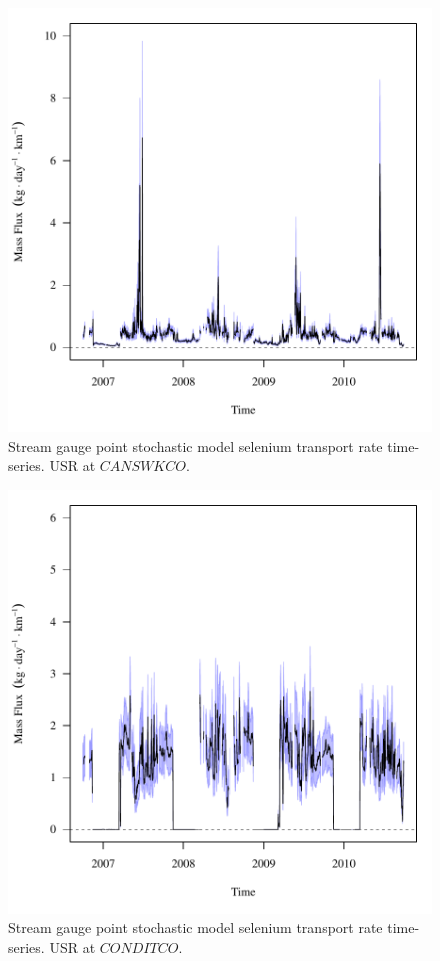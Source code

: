 \begin{figure}[htbp]
	\begin{center}
	\includegraphics[width=6in]{"Figures/Results_USR/f CAN"}
	\caption{Stream gauge point stochastic model selenium transport rate time-series.  USR at $CANSWKCO$.}
	\end{center}
\end{figure}
\newpage

\begin{figure}[htbp]
	\begin{center}
	\includegraphics[width=6in]{"Figures/Results_USR/f CON"}
	\caption{Stream gauge point stochastic model selenium transport rate time-series.  USR at $CONDITCO$.}
	\end{center}
\end{figure}
\newpage

